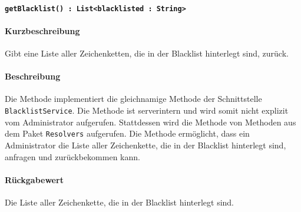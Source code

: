 \paragraph{\texttt{getBlacklist() : List<blacklisted : String>}}%
\paragraph*{Kurzbeschreibung}
Gibt eine Liste aller Zeichenketten, die in der Blacklist hinterlegt sind, zurück.
\paragraph*{Beschreibung}
Die Methode implementiert die gleichnamige Methode der Schnittstelle \texttt{BlacklistService}.
Die Methode ist serverintern und wird somit nicht explizit vom Administrator aufgerufen.
Stattdessen wird die Methode von Methoden aus dem Paket \texttt{Resolvers} aufgerufen.
Die Methode ermöglicht, dass ein Administrator die Liste aller Zeichenkette, die in der Blacklist hinterlegt sind, anfragen und zurückbekommen kann.
\paragraph*{Rückgabewert}
Die Liste aller Zeichenkette, die in der Blacklist hinterlegt sind.
